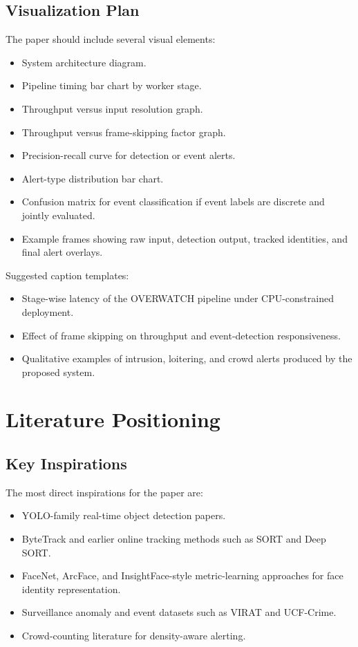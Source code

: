 \documentclass[11pt]{article}
\begin{document}
\subsection{Visualization Plan}
The paper should include several visual elements:

\begin{itemize}
\item System architecture diagram.
\item Pipeline timing bar chart by worker stage.
\item Throughput versus input resolution graph.
\item Throughput versus frame-skipping factor graph.
\item Precision-recall curve for detection or event alerts.
\item Alert-type distribution bar chart.
\item Confusion matrix for event classification if event labels are discrete and jointly evaluated.
\item Example frames showing raw input, detection output, tracked identities, and final alert overlays.
\end{itemize}

Suggested caption templates:

\begin{itemize}
\item Stage-wise latency of the OVERWATCH pipeline under CPU-constrained deployment.
\item Effect of frame skipping on throughput and event-detection responsiveness.
\item Qualitative examples of intrusion, loitering, and crowd alerts produced by the proposed system.
\end{itemize}

\section{Literature Positioning}

\subsection{Key Inspirations}
The most direct inspirations for the paper are:

\begin{itemize}
\item YOLO-family real-time object detection papers.
\item ByteTrack and earlier online tracking methods such as SORT and Deep SORT.
\item FaceNet, ArcFace, and InsightFace-style metric-learning approaches for face identity representation.
\item Surveillance anomaly and event datasets such as VIRAT and UCF-Crime.
\item Crowd-counting literature for density-aware alerting.
\end{itemize}
\end{document}
